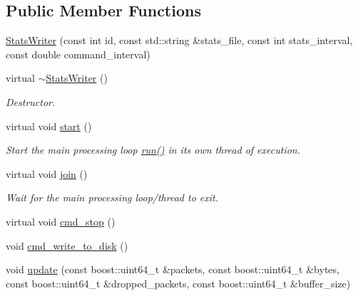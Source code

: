 \subsection*{Public Member Functions}
\begin{DoxyCompactItemize}
\item 
\hyperlink{class_stats_writer_ab5936cac54f3266df9a91cf0c370e291}{StatsWriter} (const int id, const std::string \&stats\_\-file, const int stats\_\-interval, const double command\_\-interval)
\item 
\hypertarget{class_stats_writer_a2fe7212142fecee66fb356244bdd33f8}{
virtual \hyperlink{class_stats_writer_a2fe7212142fecee66fb356244bdd33f8}{$\sim$StatsWriter} ()}
\label{class_stats_writer_a2fe7212142fecee66fb356244bdd33f8}

\begin{DoxyCompactList}\small\item\em Destructor. \end{DoxyCompactList}\item 
\hypertarget{class_stats_writer_aedabf23ca2c014f9a3f24e81ac27781b}{
virtual void \hyperlink{class_stats_writer_aedabf23ca2c014f9a3f24e81ac27781b}{start} ()}
\label{class_stats_writer_aedabf23ca2c014f9a3f24e81ac27781b}

\begin{DoxyCompactList}\small\item\em Start the main processing loop \hyperlink{class_stats_writer_adae8b6f9a5172be2f18d2cbdcb1700b0}{run()} in its own thread of execution. \end{DoxyCompactList}\item 
\hypertarget{class_stats_writer_ac58a3da20e0469fb31215dba379087d7}{
virtual void \hyperlink{class_stats_writer_ac58a3da20e0469fb31215dba379087d7}{join} ()}
\label{class_stats_writer_ac58a3da20e0469fb31215dba379087d7}

\begin{DoxyCompactList}\small\item\em Wait for the main processing loop/thread to exit. \end{DoxyCompactList}\item 
virtual void \hyperlink{class_stats_writer_abb59955e991765cd648bf65c58749f4f}{cmd\_\-stop} ()
\item 
void \hyperlink{class_stats_writer_a4749a7810223ed2b49340fe8aa0b92af}{cmd\_\-write\_\-to\_\-disk} ()
\item 
void \hyperlink{class_stats_writer_a7b73b711a050b4bd17fe7489db8231d4}{update} (const boost::uint64\_\-t \&packets, const boost::uint64\_\-t \&bytes, const boost::uint64\_\-t \&dropped\_\-packets, const boost::uint64\_\-t \&buffer\_\-size)
\end{DoxyCompactItemize}
